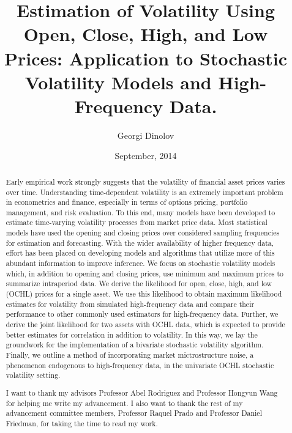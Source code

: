 \documentclass[11pt,a4paper,oneside]{report}
\title{Estimation of Volatility Using Open, Close, High, and Low Prices: Application to Stochastic 
Volatility Models and High-Frequency Data. }
\author{Georgi Dinolov}
\date{September, 2014}
\begin{document}
\maketitle

\begin{abstract}
Early empirical work strongly suggests that the volatility of financial asset prices varies over time. Understanding time-dependent volatility is an extremely important problem in econometrics and finance, especially in terms of options pricing, portfolio management, and risk evaluation. To this end, many models have been developed to estimate time-varying  volatility processes from market price data. Most statistical models have used the opening and closing prices over considered sampling frequencies for estimation and forecasting. With the wider availability of higher frequency data, effort has been placed on developing models and algorithms that utilize more of this abundant information to improve inference. We focus on stochastic volatility models which, in addition to opening and closing prices, use minimum and maximum prices to summarize intraperiod data.  We derive the likelihood for open, close, high, and low (OCHL) prices for a single asset. We use this likelihood to obtain maximum likelihood estimates for volatility from simulated high-frequency data and compare their performance to other commonly used estimators for high-frequency data. Further, we derive the joint likelihood for two assets with OCHL data, which is expected to provide better estimates for correlation in addition to volatility. In this way, we lay the groundwork for the implementation of a bivariate stochastic volatility algorithm. Finally, we outline a method of incorporating market mictrostructure noise, a phenomenon endogenous to high-frequency data, in the univariate OCHL stochastic volatility setting.
\end{abstract}

\renewcommand{\abstractname}{Acknowledgements}
\begin{abstract}
I want to thank my advisors Professor Abel Rodriguez and Professor Hongyun Wang for helping me write my advancement. I also want to thank the rest of my advancement committee members, Professor Raquel Prado and Professor Daniel Friedman, for taking the time to read my work. 
\end{abstract}

\tableofcontents









%


\end{document}
